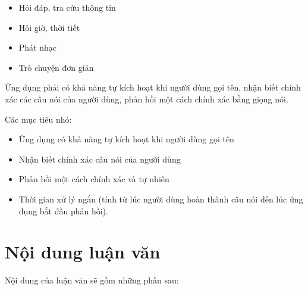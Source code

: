 \begin{itemize}
    \item Hỏi đáp, tra cứu thông tin
    \item Hỏi giờ, thời tiết
    \item Phát nhạc
    \item Trò chuyện đơn giản
\end{itemize}

Ứng dụng phải có khả năng tự kích hoạt khi người dùng gọi tên, nhận biết chính xác các câu nói của người dùng, phản hồi một cách chính xác bằng giọng nói.

Các mục tiêu nhỏ:

\begin{itemize}
    \item Ứng dụng có khả năng tự kích hoạt khi người dùng gọi tên
    \item Nhận biết chính xác câu nói của người dùng
    \item Phản hồi một cách chính xác và tự nhiên
    \item Thời gian xử lý ngắn (tính từ lúc người dùng hoàn thành câu nói đến lúc ứng dụng bắt đầu phản hồi).
\end{itemize}

\section{Nội dung luận văn}

Nội dung của luận văn sẽ gồm những phần sau:

